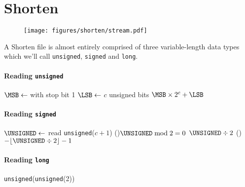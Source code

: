 \chapter{Shorten}
\begin{figure}[h]
\texttt{[image: figures/shorten/stream.pdf]}
\end{figure}
A Shorten file is almost entirely comprised of three variable-length
data types which we'll call \texttt{unsigned}, \texttt{signed} and
\texttt{long}.
\subsubsection{Reading \texttt{unsigned}}
{
  $\text{\MSB} \leftarrow$ \UNARY with stop bit 1\;
  $\text{\LSB} \leftarrow$ \READ $c$ unsigned bits\;
  \Return $\text{\MSB} \times 2 ^ c + \text{\LSB}$\;
  \EALGORITHM
}
\subsubsection{Reading \texttt{signed}}
{
  $\text{\UNSIGNED} \leftarrow$ read \texttt{unsigned}($c + 1$)\;
  \eIf(){$\UNSIGNED \bmod 2 = 0$}{
    \Return $\UNSIGNED \div 2$\;
  }(){
    \Return $-\lfloor\UNSIGNED \div 2\rfloor - 1$\;
  }
  \EALGORITHM
}
\subsubsection{Reading \texttt{long}}
{
  \Return \texttt{unsigned}(\texttt{unsigned}(2))\;
  \EALGORITHM
}

\clearpage

